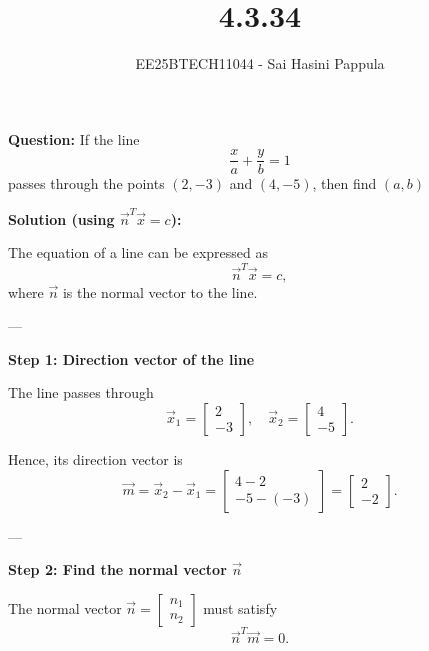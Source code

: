 \documentclass[journal]{IEEEtran}
\begin{document}

\vspace{3cm}

\title{4.3.34}
\author{EE25BTECH11044 - Sai Hasini Pappula}
 \maketitle
{\let\newpage\relax\maketitle}

\renewcommand{\thefigure}{\theenumi}
\renewcommand{\thetable}{\theenumi}
\setlength{\intextsep}{10pt} %


\renewcommand{\thetable}{\theenumi}
\textbf{Question:}  
If the line 
\[
\frac{x}{a} + \frac{y}{b} = 1
\]
passes through the points $(2,-3)$ and $(4,-5)$, then find $(a,b)$ 

\textbf{Solution (using $\vec{n}^T \vec{x} = c$):}

The equation of a line can be expressed as
\[
\vec{n}^T \vec{x} = c,
\]
where $\vec{n}$ is the normal vector to the line.

---

\textbf{Step 1: Direction vector of the line}

The line passes through
\[
\vec{x}_1 = \begin{bmatrix}2\\-3\end{bmatrix}, \quad
\vec{x}_2 = \begin{bmatrix}4\\-5\end{bmatrix}.
\]

Hence, its direction vector is
\[
\vec{m} = \vec{x}_2 - \vec{x}_1
= \begin{bmatrix}4-2 \\ -5 - (-3)\end{bmatrix}
= \begin{bmatrix}2 \\ -2\end{bmatrix}.
\]

---

\textbf{Step 2: Find the normal vector $\vec{n}$}

The normal vector $\vec{n} = \begin{bmatrix}n_1 \\ n_2\end{bmatrix}$ must satisfy
\[
\vec{n}^T \vec{m} = 0.
\]
\end{document}
